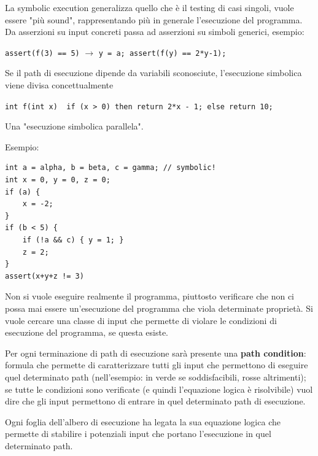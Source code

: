 La symbolic execution generalizza quello che è il testing di casi singoli, vuole essere "più sound", rappresentando più in generale l'esecuzione del programma. Da asserzioni su input concreti passa ad asserzioni su simboli generici, esempio: 
\begin{center}
	\texttt{assert(f(3) == 5)} $\longrightarrow$ \texttt{y = a; assert(f(y) == 2*y-1);}
\end{center}

Se il path di esecuzione dipende da variabili sconosciute, l'esecuzione simbolica viene divisa concettualmente
\begin{center}
	\texttt{int f(int x) { if (x > 0) then return 2*x - 1; else return 10; }}
\end{center}

Una "esecuzione simbolica parallela".

Esempio: 
\begin{center}
	\begin{minipage}{0.78\linewidth}
		\begin{verbatim}
int a = alpha, b = beta, c = gamma; // symbolic!
int x = 0, y = 0, z = 0;
if (a) {
	x = -2;
}
if (b < 5) {
	if (!a && c) { y = 1; }
	z = 2;
}
assert(x+y+z != 3)
		\end{verbatim}
	\end{minipage}
\end{center}

\begin{center}
	
\end{center}

Non si vuole eseguire realmente il programma, piuttosto verificare che non ci possa mai essere un'esecuzione del programma che viola determinate proprietà. Si vuole cercare una classe di input che permette di violare le condizioni di esecuzione del programma, se questa esiste.

Per ogni terminazione di path di esecuzione sarà presente una \textbf{path condition}: formula che permette di caratterizzare tutti gli input che permettono di eseguire quel determinato path (nell'esempio: in verde se soddisfacibili, rosse altrimenti); se tutte le condizioni sono verificate (e quindi l'equazione logica è risolvibile) vuol dire che gli input permettono di entrare in quel determinato path di esecuzione.

Ogni foglia dell'albero di esecuzione ha legata la sua equazione logica che permette di stabilire i potenziali input che portano l'esecuzione in quel determinato path.

